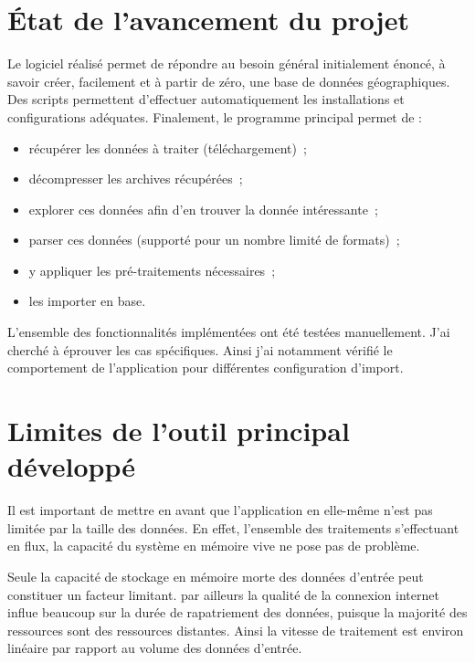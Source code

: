 
\section*{État de l'avancement du projet}

Le logiciel réalisé permet de répondre au besoin général initialement énoncé, à savoir créer, facilement et à partir de zéro, une base de données géographiques. Des scripts permettent d'effectuer automatiquement les installations et configurations adéquates. Finalement, le programme principal permet de :

\begin{itemize}
  \item récupérer les données à traiter (téléchargement)~;
  \item décompresser les archives récupérées~;
  \item explorer ces données afin d'en trouver la donnée intéressante~;
  \item parser ces données (supporté pour un nombre limité de formats)~;
  \item y appliquer les pré-traitements nécessaires~;
  \item les importer en base.
\end{itemize}

L'ensemble des fonctionnalités implémentées ont été testées manuellement. J'ai cherché à éprouver les cas spécifiques. Ainsi j'ai notamment vérifié le comportement de l'application pour différentes configuration d'import.

\section*{Limites de l'outil principal développé}

Il est important de mettre en avant que l'application en elle-même n'est pas limitée par la taille des données. En effet, l'ensemble des traitements s'effectuant en flux, la capacité du système en mémoire vive ne pose pas de problème.

Seule la capacité de stockage en mémoire morte des données d'entrée peut constituer un facteur limitant. par ailleurs la qualité de la connexion internet influe beaucoup sur la durée de rapatriement des données, puisque la majorité des ressources sont des ressources distantes. Ainsi la vitesse de traitement est environ linéaire par rapport au volume des données d'entrée.


